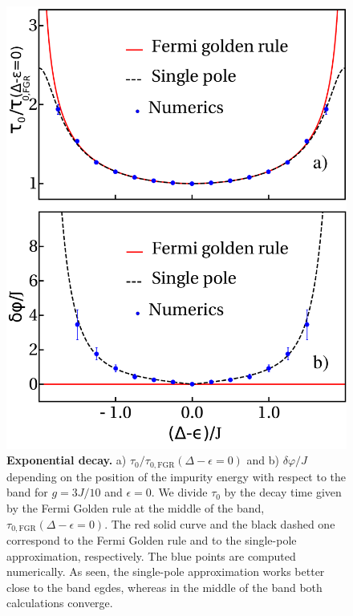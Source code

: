 \documentclass[aps,pra,twocolumn,floatfix,superscriptaddress]{revtex4-1}%
\begin{document}
\begin{figure}[thb!]
\includegraphics[width=1.0\columnwidth]{gamma_phi_g_0_3.pdf}
\caption{{\bf Exponential decay.} a) $\tau_0/\tau_{0,\text{FGR}}(\Delta-\epsilon=0)$ and b) $\delta\varphi/J$ depending on the position of the impurity energy with respect to the band for $g=3J/10$ and $\epsilon=0$. {\color{blue}We divide $\tau_0$ by the decay time given by the Fermi Golden rule at the middle of the band, $\tau_{0,\text{FGR}}(\Delta-\epsilon=0)$. The red solid curve and the black dashed one correspond to the Fermi Golden rule and to the single-pole approximation, respectively.} The blue points are computed numerically. As seen, the single-pole approximation works better close to the band egdes, whereas in the middle of the band both calculations converge.}\label{fig:qubit_decay}
\end{figure}
\end{document}
